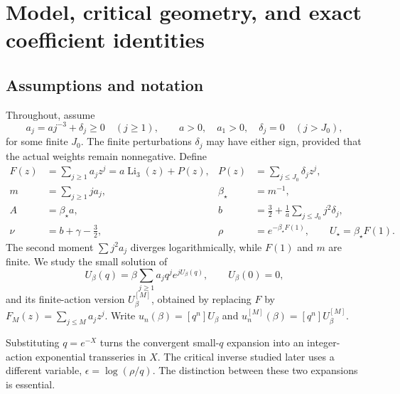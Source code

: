 \documentclass[11pt,a4paper]{article}
\numberwithin{equation}{section}
\theoremstyle{definition}
\theoremstyle{remark}
\DeclareMathOperator{\Li}{Li}
\newcommand{\bs}{\beta_\star}
\newcommand{\Uc}{U_\star}
\begin{document}
\section{Model, critical geometry, and exact coefficient identities}
\label{sec:model}

\subsection{Assumptions and notation}
Throughout, assume
\begin{equation}
 a_j=a j^{-3}+\delta_j\ge0\quad(j\ge1),\qquad
 a>0,\quad a_1>0,\quad \delta_j=0\quad(j>J_0),
\label{eq:weights}
\end{equation}
for some finite \(J_0\). The finite perturbations \(\delta_j\) may have either
sign, provided that the actual weights remain nonnegative. Define
\begin{align}
 F(z)&=\sum_{j\ge1}a_jz^j=a\Li_3(z)+P(z),
 &P(z)&=\sum_{j\le J_0}\delta_jz^j,\label{eq:F}\\
 m&=\sum_{j\ge1}ja_j,
 &\bs&=m^{-1},\label{eq:critical-beta}\\
 A&=\bs a,
 &b&=\frac32+\frac1a\sum_{j\le J_0}j^2\delta_j,\label{eq:Ab}\\
 \nu&=b+\gamma-\frac32,
 &\rho&=e^{-\bs F(1)},\qquad \Uc=\bs F(1).\label{eq:nu-rho}
\end{align}
The second moment \(\sum j^2a_j\) diverges logarithmically, while \(F(1)\) and
\(m\) are finite. We study the small solution of
\begin{equation}
 U_\beta(q)=\beta\sum_{j\ge1}a_jq^j e^{jU_\beta(q)},\qquad U_\beta(0)=0,
 \label{eq:feedback}
\end{equation}
and its finite-action version \(U_\beta^{[M]}\), obtained by replacing \(F\) by
\(F_M(z)=\sum_{j\le M}a_jz^j\). Write
\(u_n(\beta)=[q^n]U_\beta\) and \(u_n^{[M]}(\beta)=[q^n]U_\beta^{[M]}\).

Substituting \(q=e^{-X}\) turns the convergent small-\(q\) expansion into an
integer-action exponential transseries in \(X\). The critical inverse studied
later uses a different variable, \(\epsilon=\log(\rho/q)\). The distinction
between these two expansions is essential.
\end{document}
